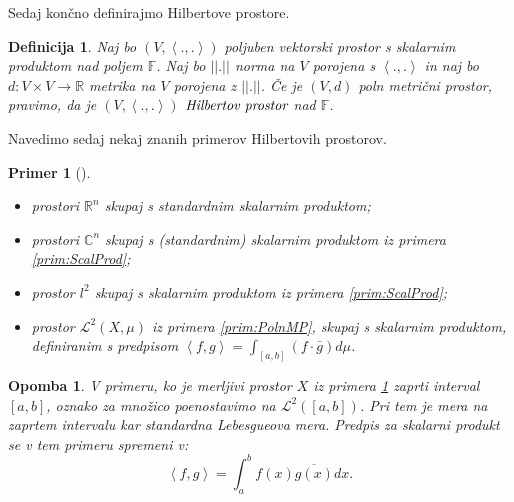 \documentclass[12pt,a4paper,oneside,fleqn,openany]{book}
\newtheorem{definicija}[izrek]{Definicija}
\newtheorem{opomba}[izrek]{Opomba}
\newtheorem{primer*}[izrek]{Primer}
\newenvironment{primer}[1][]{\begin{primer*}[#1]\renewcommand*{\qedsymbol}{$\diamondsuit$}\pushQED{\qed}}{\popQED\end{primer*}}
\newcommand{\R}{\mathbb{R}}
\newcommand{\F}{\mathbb{F}}
\newcommand{\C}{\mathbb{C}}
\newcommand{\abs}[1]{\ensuremath{\lvert #1 \rvert}}
\newcommand{\norm}[1]{\abs{\abs{#1}}}
\newcommand{\pojem}[1]{\ensuremath{\emph{#1}}}
\newcommand{\Sp}[2]{\ensuremath{\left<#1, #2\right>}}
\newcommand{\map}[3]{\ensuremath{{#1}:{#2}\rightarrow{#3}}}
\begin{document}
Sedaj končno definirajmo Hilbertove prostore.
\begin{definicija}
	\label{def:Hilbert}
	Naj bo $(V, \Sp{.}{.})$ poljuben vektorski prostor s skalarnim produktom nad poljem $\F$. Naj bo $\norm{.}$ norma na $V$ porojena s $\Sp{.}{.}$ in naj bo $\map{d}{V\times V}{\R}$ metrika na $V$ porojena z $\norm{.}$. Če je $(V, d)$ poln metrični prostor, pravimo, da je $(V, \Sp{.}{.})$ \pojem{Hilbertov prostor} nad $\F$. 
\end{definicija}
Navedimo sedaj nekaj znanih primerov Hilbertovih prostorov. 
\begin{primer}
	\label{prim:Hilbert}
	~
	
	\begin{itemize}
		\item prostori $\R^n$ skupaj s standardnim skalarnim produktom;
		\item prostori $\C^n$ skupaj s (standardnim) skalarnim produktom iz primera \ref{prim:ScalProd};
		\item prostor $l^2$ skupaj s skalarnim produktom iz primera \ref{prim:ScalProd};
		\item prostor $\mathcal{L}^2(X, \mu)$ iz primera \ref{prim:PolnMP}, skupaj s skalarnim produktom, definiranim s predpisom $\Sp{f}{g}= \displaystyle\int_{[a, b]}(f\cdot \bar{g}) d\mu$.
	\end{itemize}
\end{primer}

\begin{opomba}
	\label{opomb:Hilbert}
	V primeru, ko je merljivi prostor $X$ iz primera \ref{prim:Hilbert} zaprti interval $[a, b]$, oznako za množico poenostavimo na $\mathcal{L}^2([a, b])$. Pri tem je mera na zaprtem intervalu kar standardna Lebesgueova mera. Predpis za skalarni produkt se v tem primeru spremeni v: $$\Sp{f}{g} = \int_{a}^{b}f(x)\overline{g(x)}dx.$$
\end{opomba}
\end{document}
